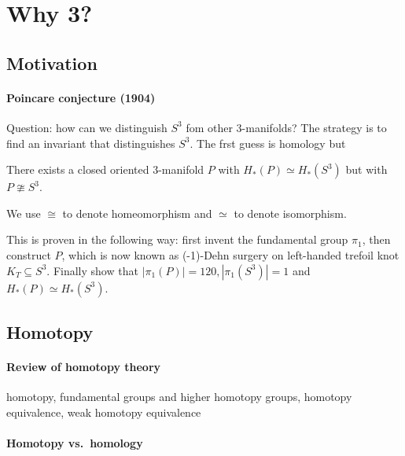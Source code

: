 \documentclass[a4paper]{article}
\begin{document}


\tableofcontents

\setcounter{section}{-1}

\section{Why 3?}

\subsection{Motivation}

\paragraph{Poincare conjecture (1904)}

Question: how can we distinguish \(S^3\) fom other 3-manifolds? The strategy is to find an invariant that distinguishes \(S^3\). The frst guess is homology but

\begin{theorem}[Poincare]
  There exists a closed oriented 3-manifold \(P\) with \(H_*(P) \simeq H_*(S^3)\) but with \(P \ncong S^3\).
\end{theorem}

\begin{notation}
  We use \(\cong\) to denote homeomorphism and \(\simeq\) to denote isomorphism.
\end{notation}

This is proven in the following way: first invent the fundamental group \(\pi_1\), then construct \(P\), which is now known as (-1)-Dehn surgery on left-handed trefoil knot \(K_T \subseteq S^3\). Finally show that \(|\pi_1(P)| = 120, |\pi_1(S^3)| = 1\) and \(H_*(P) \simeq H_*(S^3)\).

\subsection{Homotopy}

\paragraph{Review of homotopy theory}

homotopy, fundamental groups and higher homotopy groups, homotopy equivalence, weak homotopy equivalence

\paragraph{Homotopy vs.\ homology}
\end{document}
